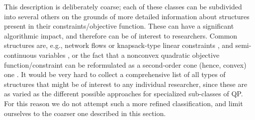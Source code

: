 %
This description is deliberately coarse; each of these classes can be subdivided into several others on the grounds of more detailed information about structures present in their constraints/objective function. These can have a significant algorithmic impact, and therefore can be of interest to researchers. Common structures are, e.g., network flows \cite{FrFG16,FrGaSc14,FrGaSt16a,FGGP11,tadayon-smith:2013} or knapsack-type linear constraints \cite{FrFG16,FrGo13b,FGGP11}, and semi-continuous variables \cite{FrFG16,FrGaSc14,FrGaSt16a,FrGe06a,FrGe07a,FrGe09a,FGGP11}, or the fact that a nonconvex quadratic objective function/constraint can be reformulated as a second-order cone (hence, convex) one \cite{FrFG16,FrGaSc14,FrGaSt16a,FrGe09a,FGGP11}. It would be very hard to collect a comprehensive list of all types of structures that might be of interest to any individual researcher, since these are as varied as the different possible approaches for specialized sub-classes of QP. For this reason we do not attempt such a more refined classification, and limit ourselves to the coarser one described in this section.

